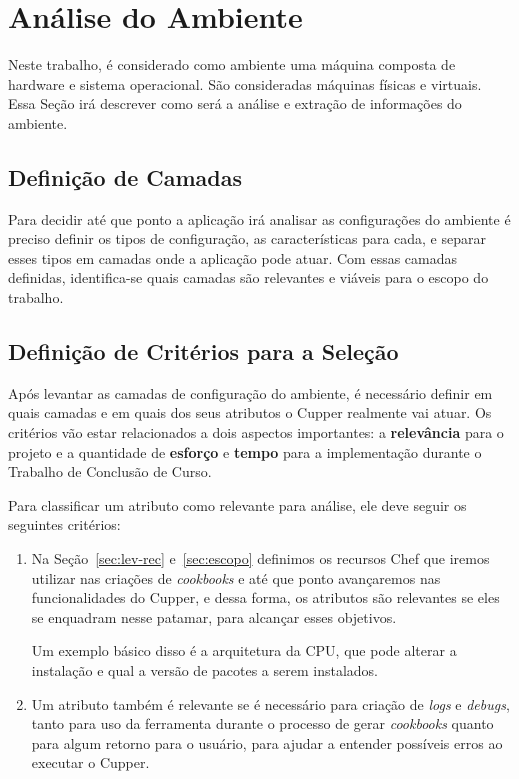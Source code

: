 \section{Análise do Ambiente}

Neste trabalho, é considerado como ambiente uma máquina composta
de hardware e sistema operacional. São consideradas máquinas físicas
e virtuais. Essa Seção irá descrever como será a análise e extração
de informações do ambiente.

\subsection{Definição de Camadas}

Para decidir até que ponto a aplicação irá analisar as configurações
do ambiente é preciso definir os tipos de configuração, as características para
cada, e separar esses tipos em camadas onde a aplicação pode atuar.
Com essas camadas definidas, identifica-se quais camadas são relevantes e viáveis
para o escopo do trabalho.


\subsection{Definição de Critérios para a Seleção}
\label{sec:defcritcamada}
Após levantar as camadas de configuração do ambiente, é necessário definir em
quais camadas e em quais dos seus atributos o Cupper realmente vai atuar. 
Os critérios vão estar relacionados a dois aspectos importantes: a \textbf{relevância} 
para o projeto e a quantidade de \textbf{esforço} e \textbf{tempo} para a implementação durante
o Trabalho de Conclusão de Curso.

Para classificar um atributo como relevante para análise, ele deve seguir os
seguintes critérios:

\begin{enumerate}

  \item Na Seção~\ref{sec:lev-rec} e~\ref{sec:escopo} definimos os recursos Chef
que iremos utilizar nas criações de \textit{cookbooks} e até que ponto 
avançaremos nas funcionalidades do Cupper, e dessa forma, os atributos
são relevantes se eles se enquadram nesse patamar, para alcançar esses objetivos.

Um exemplo básico disso é a arquitetura da CPU, que pode alterar a instalação
e qual a versão de pacotes a serem instalados.

\item Um atributo também é relevante se é necessário para criação de \textit{logs} 
e \textit{debugs}, tanto para uso da ferramenta durante o processo de gerar 
\textit{cookbooks} quanto para algum retorno para o usuário, para ajudar 
a entender possíveis erros ao executar
o Cupper.
\end{enumerate}

